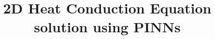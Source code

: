 \documentclass{beamer}
\title{ 2D Heat Conduction Equation solution using PINNs}
\begin{document}
\begin{frame}
	\maketitle
\end{frame}




\end{document}
